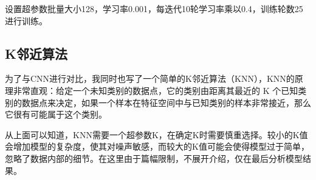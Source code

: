 设置超参数批量大小128，学习率0.001，每迭代10轮学习率乘以0.4，训练轮数25进行训练。

\subsection{K邻近算法}

为了与CNN进行对比，我同时也写了一个简单的K邻近算法（KNN），KNN的原理非常直观：给定一个未知类别的数据点，它的类别由距离其最近的 K 个已知类别的数据点来决定，如果一个样本在特征空间中与已知类别的样本非常接近，那么它很有可能属于这个类别。

从上面可以知道，KNN需要一个超参数K，在确定K时需要慎重选择。较小的K值会增加模型的复杂度，使其对噪声敏感，而较大的K值可能会使得模型过于简单，忽略了数据内部的细节。在这里由于篇幅限制，不展开介绍，仅在最后分析模型结果。